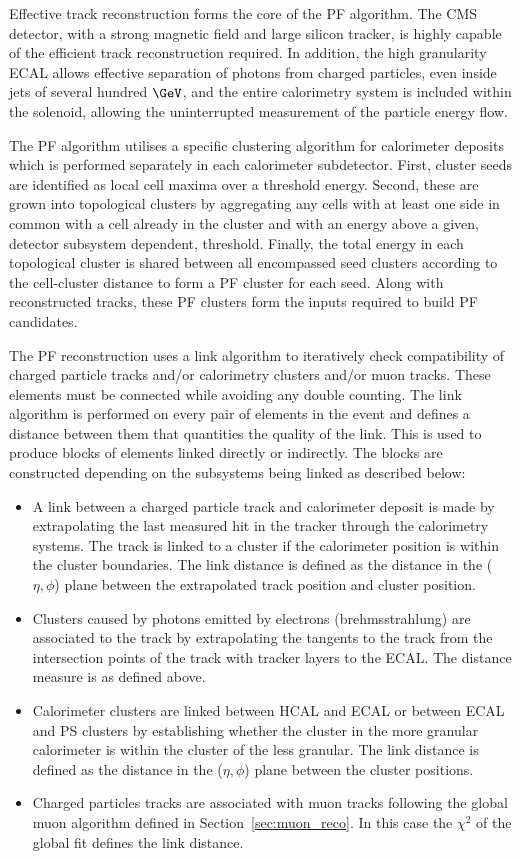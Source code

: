 Effective track reconstruction forms the core of the PF algorithm. The CMS detector, with a strong magnetic field
and large silicon tracker, is highly capable of the efficient track
reconstruction required. In addition, the high granularity ECAL allows effective separation of photons from 
charged particles, even inside jets of several hundred $\GeV$, and the entire calorimetry system 
is included within the solenoid, allowing the uninterrupted measurement 
of the particle energy flow.

The PF algorithm utilises a specific clustering algorithm for calorimeter deposits which is performed separately 
in each calorimeter subdetector. First, cluster seeds are identified as local cell maxima over a threshold energy.
Second, these are grown into topological clusters by aggregating any cells with at least one side in common with
a cell already in the cluster and with an energy above a given, detector
subsystem dependent, threshold. Finally, the total energy in each topological cluster
is shared between all encompassed seed clusters according to the cell-cluster distance to 
form a PF cluster for each seed. Along with reconstructed tracks, these PF clusters form the inputs 
required to build PF candidates.

The PF reconstruction uses a link algorithm to iteratively check compatibility of charged particle tracks 
and/or calorimetry clusters and/or muon tracks. These elements must be connected while avoiding any double counting. 
The link algorithm is performed on every pair of elements in the event and defines a distance between them
that quantities the quality of the link. This is used to produce blocks of elements linked directly 
or indirectly. The blocks are constructed depending on the subsystems being linked as described below:

\begin{itemize}
\item A link between a charged particle track and calorimeter deposit is made by extrapolating the last measured
hit in the tracker through the calorimetry systems. The track is linked to a cluster if the calorimeter position
is within the cluster boundaries. The link distance is defined as the distance in the ($\eta,\phi$) plane between
the extrapolated track position and cluster position.
\item Clusters caused by photons emitted by electrons (brehmsstrahlung) are associated to the track by extrapolating
the tangents to the track from the intersection points of the track with tracker layers to the ECAL. The distance measure
is as defined above.
\item Calorimeter clusters are linked between HCAL and ECAL or between ECAL and PS clusters by establishing whether
the cluster in the more granular calorimeter is within the cluster of the less granular. The link distance is defined
as the distance in the ($\eta,\phi$) plane between the cluster positions.
\item Charged particles tracks are associated with muon tracks following the global muon algorithm defined in 
Section~\ref{sec:muon_reco}. In this case the $\chi^2$ of the global fit defines the link distance.
\end{itemize}

